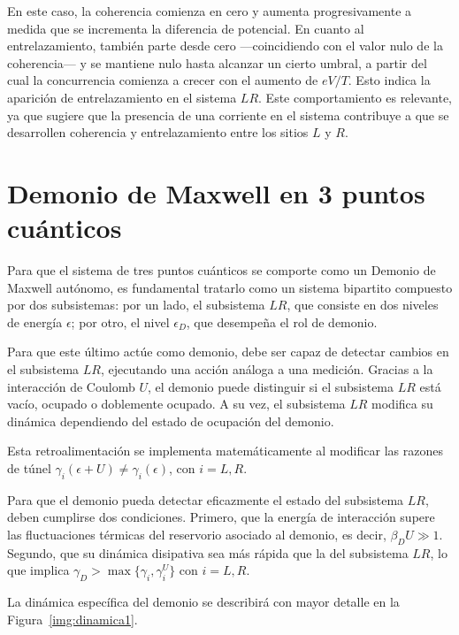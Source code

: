 En este caso, la coherencia comienza en cero y aumenta progresivamente a medida que se incrementa la diferencia de potencial. En cuanto al entrelazamiento, también parte desde cero —coincidiendo con el valor nulo de la coherencia— y se mantiene nulo hasta alcanzar un cierto umbral, a partir del cual la concurrencia comienza a crecer con el aumento de \( eV/T \). Esto indica la aparición de entrelazamiento en el sistema \( LR \). Este comportamiento es relevante, ya que sugiere que la presencia de una corriente en el sistema contribuye a que se desarrollen coherencia y entrelazamiento entre los sitios $L$ y $R$.  


\label{sec5:transporte}

\newpage

\section{Demonio de Maxwell en 3 puntos cuánticos}
Para que el sistema de tres puntos cuánticos se comporte como un Demonio de Maxwell autónomo, es fundamental tratarlo como un sistema bipartito compuesto por dos subsistemas: por un lado, el subsistema $LR$, que consiste en dos niveles de energía $\epsilon$; por otro, el nivel $\epsilon_D$, que desempeña el rol de demonio.

Para que este último actúe como demonio, debe ser capaz de detectar cambios en el subsistema $LR$, ejecutando una acción análoga a una medición. Gracias a la interacción de Coulomb $U$, el demonio puede distinguir si el subsistema $LR$ está vacío, ocupado o doblemente ocupado. A su vez, el subsistema $LR$ modifica su dinámica dependiendo del estado de ocupación del demonio.

Esta retroalimentación se implementa matemáticamente al modificar las razones de túnel $\gamma_{i}(\epsilon + U) \neq \gamma_{i}(\epsilon)$, con $i = L, R$. 

Para que el demonio pueda detectar eficazmente el estado del subsistema $LR$, deben cumplirse dos condiciones. Primero, que la energía de interacción supere las fluctuaciones térmicas del reservorio asociado al demonio, es decir, $\beta_{D} U \gg 1$. Segundo, que su dinámica disipativa sea más rápida que la del subsistema $LR$, lo que implica $\gamma_{D} > \max\{\gamma_{i}, \gamma^{U}_{i}\}$ con $i = L, R$.

La dinámica específica del demonio se describirá con mayor detalle en la Figura~\ref{img:dinamica1}.


